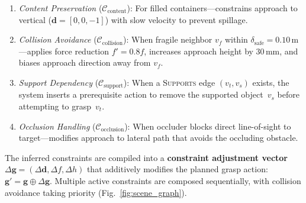 \documentclass[letterpaper, 10pt, conference]{ieeeconf}
\begin{document}
\begin{enumerate}
    \item \textit{Content Preservation} ($\mathcal{C}_{\mathrm{content}}$): For filled containers---constrains approach to vertical ($\mathbf{d} = [0, 0, -1]$) with slow velocity to prevent spillage.
    
    \item \textit{Collision Avoidance} ($\mathcal{C}_{\mathrm{collision}}$): When fragile neighbor $v_f$ within $\delta_{\mathrm{safe}} = 0.10$\,m---applies force reduction $f' = 0.8f$, increases approach height by 30\,mm, and biases approach direction away from $v_f$.
    
    \item \textit{Support Dependency} ($\mathcal{C}_{\mathrm{support}}$): When a \textsc{Supports} edge $(v_t, v_s)$ exists, the system inserts a prerequisite action to remove the supported object~$v_s$ before attempting to grasp~$v_t$.
    
    \item \textit{Occlusion Handling} ($\mathcal{C}_{\mathrm{occlusion}}$): When occluder blocks direct line-of-sight to target---modifies approach to lateral path that avoids the occluding obstacle.
\end{enumerate}

The inferred constraints are compiled into a \textbf{constraint adjustment vector} $\Delta\mathbf{g} = (\Delta\mathbf{d}, \Delta f, \Delta h)$ that additively modifies the planned grasp action: $\mathbf{g}' = \mathbf{g} \oplus \Delta\mathbf{g}$.
Multiple active constraints are composed sequentially, with collision avoidance taking priority (Fig.~\ref{fig:scene_graph}).
\end{document}
